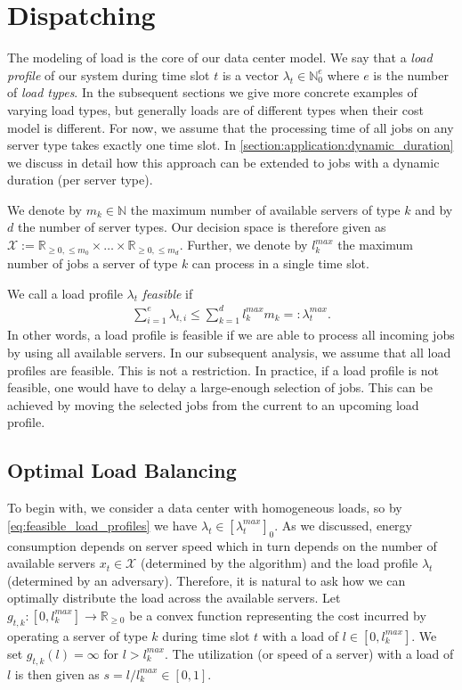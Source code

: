 \section{Dispatching}\label{section:application:dispatching}

The modeling of load is the core of our data center model. We say that a \textit{load profile} of our system during time slot $t$ is a vector $\lambda_t \in \mathbb{N}_0^e$ where $e$ is the number of \textit{load types}. In the subsequent sections we give more concrete examples of varying load types, but generally loads are of different types when their cost model is different. For now, we assume that the processing time of all jobs on any server type takes exactly one time slot. In \autoref{section:application:dynamic_duration} we discuss in detail how this approach can be extended to jobs with a dynamic duration (per server type).

We denote by $m_k \in \mathbb{N}$ the maximum number of available servers of type $k$ and by $d$ the number of server types. Our decision space is therefore given as $\mathcal{X} := \mathbb{R}_{\geq 0, \leq m_0} \times \dots \times \mathbb{R}_{\geq 0, \leq m_d}$. Further, we denote by $l_k^{max}$ the maximum number of jobs a server of type $k$ can process in a single time slot.

We call a load profile $\lambda_t$ \textit{feasible} if \begin{align}
    \sum_{i=1}^e \lambda_{t,i} \leq \sum_{k=1}^d l_k^{max} m_k =: \lambda_t^{max}.
\label{eq:feasible_load_profiles}
\end{align} In other words, a load profile is feasible if we are able to process all incoming jobs by using all available servers. In our subsequent analysis, we assume that all load profiles are feasible. This is not a restriction. In practice, if a load profile is not feasible, one would have to delay a large-enough selection of jobs. This can be achieved by moving the selected jobs from the current to an upcoming load profile.

\subsection{Optimal Load Balancing}\label{section:application:dispatching:optimal_load_balancing}

To begin with, we consider a data center with homogeneous loads, so by \autoref{eq:feasible_load_profiles} we have $\lambda_t \in [\lambda_t^{max}]_0$. As we discussed, energy consumption depends on server speed which in turn depends on the number of available servers $x_t \in \mathcal{X}$ (determined by the algorithm) and the load profile $\lambda_t$ (determined by an adversary). Therefore, it is natural to ask how we can optimally distribute the load across the available servers. Let $g_{t,k} : [0,l_k^{max}] \to \mathbb{R}_{\geq 0}$ be a convex function representing the cost incurred by operating a server of type $k$ during time slot $t$ with a load of $l \in [0,l_k^{max}]$. We set $g_{t,k}(l) = \infty$ for $l > l_k^{max}$. The utilization (or speed of a server) with a load of $l$ is then given as $s = l / l_k^{max} \in [0,1]$.


